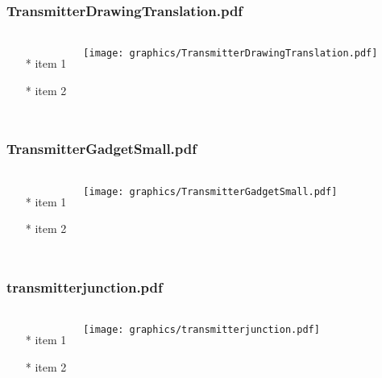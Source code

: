 \begin{frame} \frametitle{TransmitterDrawingTranslation.pdf}
    \begin{columns}[c]
        \begin{itemize}
            \item[*] item 1
            \item[*] item 2
        \end{itemize}
        \begin{minipage}{\linewidth}
            \begin{center}
            \texttt{[image: graphics/TransmitterDrawingTranslation.pdf]}
            \label{gfx:TransmitterDrawingTranslation.pdf}
            \end{center}
        \end{minipage}
    \end{columns}
\end{frame}
\begin{frame} \frametitle{TransmitterGadgetSmall.pdf}
    \begin{columns}[c]
        \begin{itemize}
            \item[*] item 1
            \item[*] item 2
        \end{itemize}
        \begin{minipage}{\linewidth}
            \begin{center}
            \texttt{[image: graphics/TransmitterGadgetSmall.pdf]}
            \label{gfx:TransmitterGadgetSmall.pdf}
            \end{center}
        \end{minipage}
    \end{columns}
\end{frame}
\begin{frame} \frametitle{transmitterjunction.pdf}
    \begin{columns}[c]
        \begin{itemize}
            \item[*] item 1
            \item[*] item 2
        \end{itemize}
        \begin{minipage}{\linewidth}
            \begin{center}
            \texttt{[image: graphics/transmitterjunction.pdf]}
            \label{gfx:transmitterjunction.pdf}
            \end{center}
        \end{minipage}
    \end{columns}
\end{frame}
